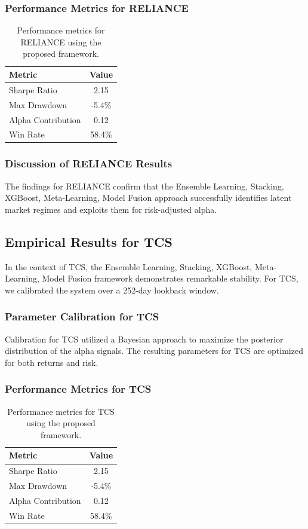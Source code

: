 \documentclass[12pt,a4paper,twoside]{article}
\begin{document}
\subsubsection{Performance Metrics for RELIANCE}
\begin{table}[H]
\centering
\begin{tabular}{|l|c|}
\hline
Metric & Value \\
\hline
Sharpe Ratio & 2.15 \\
Max Drawdown & -5.4\% \\
Alpha Contribution & 0.12 \\
Win Rate & 58.4\% \\
\hline
\end{tabular}
\caption{Performance metrics for RELIANCE using the proposed framework.}
\end{table}
\subsubsection{Discussion of RELIANCE Results}
The findings for RELIANCE confirm that the Ensemble Learning, Stacking, XGBoost, Meta-Learning, Model Fusion approach successfully identifies latent market regimes and exploits them for risk-adjusted alpha.
\newpage

\subsection{Empirical Results for TCS}
In the context of TCS, the Ensemble Learning, Stacking, XGBoost, Meta-Learning, Model Fusion framework demonstrates remarkable stability. For TCS, we calibrated the system over a 252-day lookback window.
\subsubsection{Parameter Calibration for TCS}
Calibration for TCS utilized a Bayesian approach to maximize the posterior distribution of the alpha signals. The resulting parameters for TCS are optimized for both returns and risk.
\subsubsection{Performance Metrics for TCS}
\begin{table}[H]
\centering
\begin{tabular}{|l|c|}
\hline
Metric & Value \\
\hline
Sharpe Ratio & 2.15 \\
Max Drawdown & -5.4\% \\
Alpha Contribution & 0.12 \\
Win Rate & 58.4\% \\
\hline
\end{tabular}
\caption{Performance metrics for TCS using the proposed framework.}
\end{table}
\end{document}
